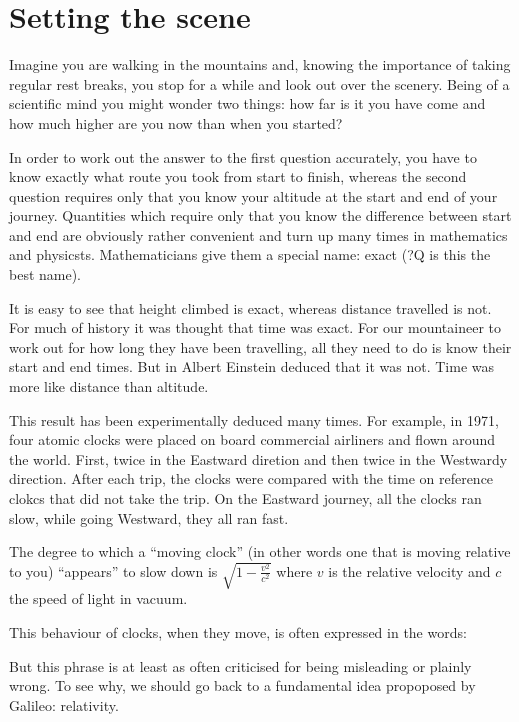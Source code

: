 \documentclass{report}
\begin{document}
\section*{Setting the scene}
Imagine you are walking in the mountains and, knowing the importance of taking regular rest breaks, you stop for a while and look out over the scenery. Being of a scientific mind you might wonder two things: how far is it you have come and how much higher are you now than when you started?

In order to work out the answer to the first question accurately, you have to know exactly what route you took from start to finish, whereas the second question requires only that you know your altitude at the start and end of your journey. Quantities which require only that you know the difference between start and end are obviously rather convenient and turn up many times in mathematics and physicsts. Mathematicians give them a special name: exact (?Q is this the best name).

It is easy to see that height climbed is exact, whereas distance travelled is not. For much of history it was thought that time was exact. For our mountaineer to work out for how long they have been travelling, all they need to do is know their start and end times. But in Albert Einstein deduced that it was not. Time was more like distance than altitude.

This result has been experimentally deduced many times. For example, in 1971, four atomic clocks were placed on board commercial airliners and flown around the world. First, twice in the Eastward diretion and then twice in the Westwardy direction. After each trip, the clocks were compared with the time on reference clokcs that did not take the trip. On the Eastward journey, all the clocks ran slow, while going Westward, they all ran fast.

The degree to which a ``moving clock'' (in other words one that is moving relative to you) ``appears'' to slow down is $\sqrt{1 - \frac{v^2}{c^2}}$ where $v$ is the relative velocity and $c$ the speed of light in vacuum.

This behaviour of clocks, when they move, is often expressed in the words:


But this phrase is at least as often criticised for being misleading or plainly wrong. To see why, we should go back to a fundamental idea propoposed by Galileo: relativity.
\end{document}
